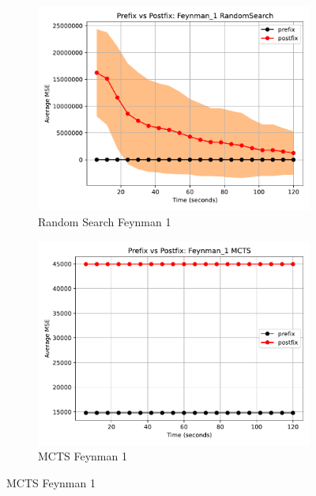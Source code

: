 \documentclass[12pt]{iopart}
\begin{document}
\begin{figure}
    \centering
    
    \begin{subfigure}[b]{0.4\textwidth}
        \includegraphics[width=\linewidth, keepaspectratio]{AIFeynman_Benchmarks/PrePostFeynman_1RandomSearch.pdf}
        \caption{Random Search Feynman 1}
        \label{subfig:feynman_1_RS}
    \end{subfigure}
    \begin{subfigure}[b]{0.4\textwidth}
        \includegraphics[width=\linewidth, keepaspectratio]{AIFeynman_Benchmarks/PrePostFeynman_1MCTS.pdf}
        \caption{MCTS Feynman 1}
        \label{subfig:feynman_1_MCTS}
    \end{subfigure}
    

\end{figure}
\end{document}
